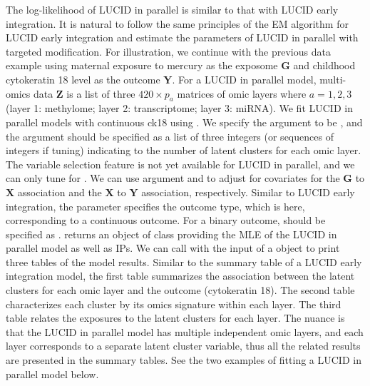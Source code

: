 The log-likelihood of LUCID in parallel is similar to that with LUCID early integration. It is natural to follow the same principles of the EM algorithm for LUCID early integration and estimate the parameters of LUCID in parallel with targeted modification. 
For illustration, we continue with the previous data example using maternal exposure to mercury as the exposome $\bm G$ and childhood cytokeratin 18 level as the outcome $\bm Y$. For a LUCID in parallel model, multi-omics data $\bm Z$ is a list of three $420 \times p_a$ matrices of omic layers where $a = 1, 2, 3$ (layer 1: methylome; layer 2: transcriptome; layer 3: miRNA). We fit LUCID in parallel models with continuous ck18 using . We specify the argument  to be , and the argument  should be specified as a list of three integers (or sequences of integers if tuning) indicating to the number of latent clusters for each omic layer. The variable selection feature is not yet available for LUCID in parallel, and we can only tune for . We can use argument  and  to adjust for covariates for the $\bm G$ to $\bm X$ association and the $\bm X$ to $\bm Y$ association, respectively. Similar to LUCID early integration, the parameter  specifies the outcome type, which is  here, corresponding to a continuous outcome. For a binary outcome,  should be specified as .  returns an object of class  providing the MLE of the LUCID in parallel model as well as IPs. We can call  with the input of a  object to print three tables of the model results. Similar to the summary table of a LUCID early integration model, the first table summarizes the association between the latent clusters for each omic layer and the outcome (cytokeratin 18). The second table characterizes each cluster by its omics signature within each layer. The third table relates the exposures to the latent clusters for each layer. The nuance is that the LUCID in parallel model has multiple independent omic layers, and each layer corresponds to a separate latent cluster variable, thus all the related results are presented in the summary tables. See the two examples of fitting a LUCID in parallel model below.
